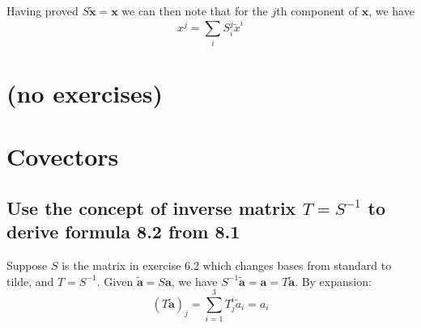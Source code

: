 \documentclass{article}
\begin{document}
Having proved $S\tilde{\mathbf{x}} = \mathbf{x}$ we can then note that for the $j$th component of $\mathbf{x}$, we have
$$x^j = \sum_i S^j_i \tilde{x}^i$$
\section{(no exercises)}
\section{Covectors}

\subsection{Use the concept of inverse matrix $T = S^{-1}$ to derive formula 8.2 from 8.1}

Suppose $S$ is the matrix in exercise 6.2 which changes bases from standard to tilde, and $T = S^{-1}$. Given $\tilde{\mathbf{a}} = S\mathbf{a}$, we have $S^{-1}\tilde{\mathbf{a}} = \mathbf{a} = T\tilde{\mathbf{a}}$. By expansion:
$$(T\tilde{\mathbf{a}})_j= \sum_{i=1}^3 T^i_j \tilde{a}_i = a_i$$
\end{document}
